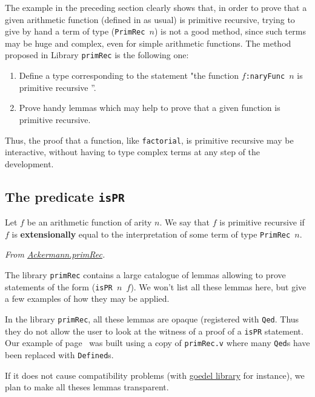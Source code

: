 The example in the preceding section clearly shows that, in order to prove that a given arithmetic function
(defined in \gallina{} as usual) is primitive recursive, trying to give  by hand a term  of type (\texttt{PrimRec $n$}) is not a good method, since such terms may be huge and complex, even for simple arithmetic functions. The method proposed in Library \texttt{primRec} is the following one:

\begin{enumerate}
\item Define a type corresponding to the statement "the function \texttt{$f$:naryFunc $n$} is primitive recursive ''.
\item Prove handy lemmas which may help to prove that a given function is primitive recursive.
\end{enumerate}

Thus, the proof that a function, like \texttt{factorial}, is primitive recursive may be interactive, without having to type complex terms at any step of the development.

\subsection{The predicate \texttt{isPR}}


Let $f$ be an arithmetic function of arity $n$. We say that $f$ is primitive recursive if $f$ is \textbf{extensionally}
equal to the interpretation of some term of type \texttt{PrimRec $n$}. 

\vspace{4pt}
\noindent
\emph{From \href{../theories/html/hydras.Ackermann.primRec.html}{Ackermann.primRec}.}



The library \texttt{primRec} contains a large catalogue of lemmas allowing to prove statements 
of the form (\texttt{isPR $n$ $f$}). We won't list all these lemmas here, but give a few examples of
how they may be applied.

\begin{remark}
In the library \texttt{primRec}, all these lemmas are opaque (registered with \texttt{Qed}. Thus they do not allow the user to look at the witness of a proof of a \texttt{isPR} statement. Our example of page~\pageref{sect:bigfac} was built using a  copy of \texttt{primRec.v} where many \texttt{Qed}s have been replaced with
\texttt{Defined}s.

If it does not cause compatibility problems (with 
\href{https://github.com/coq-community/goedel}{goedel library} for instance), we plan to make all theses lemmas transparent.
\end{remark}

